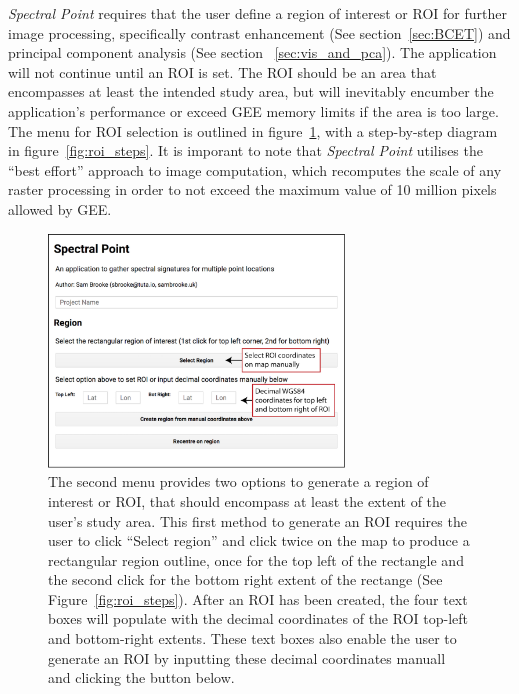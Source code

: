 \documentclass[12pt]{article}
\begin{document}

\vspace{2em}

\textit{Spectral Point} requires that the user define a region of interest or ROI for further image processing, specifically contrast enhancement (See section~\ref{sec:BCET}) and principal component analysis (See section ~\ref{sec:vis_and_pca}). The application will not continue until an ROI is set. The ROI should be an area that encompasses at least the intended study area, but will inevitably encumber the application's performance or exceed GEE memory limits if the area is too large. The menu for ROI selection is outlined in figure~\ref{fig:ROI_menu}, with a step-by-step diagram in figure~\ref{fig:roi_steps}. It is imporant to note that \textit{Spectral Point} utilises the ``best effort'' approach to image computation, which recomputes the scale of any raster processing in order to not exceed the maximum value of 10 million pixels allowed by GEE.

\begin{figure}[htbp]
\centering
\includegraphics[width=0.7\textwidth]{images/ROI_menu_reduced.jpg}
\caption{The second menu provides two options to generate a region of interest or ROI, that should encompass at least the extent of the user's study area. This first method to generate an ROI requires the user to click ``Select region'' and click twice on the map to produce a rectangular region outline, once for the top left of the rectangle and the second click for the bottom right extent of the rectange (See Figure~\ref{fig:roi_steps}). After an ROI has been created, the four text boxes will populate with the decimal coordinates of the ROI top-left and bottom-right extents. These text boxes also enable the user to generate an ROI by inputting these decimal coordinates manuall and clicking the button below.}
\label{fig:ROI_menu}
\end{figure}
\end{document}
